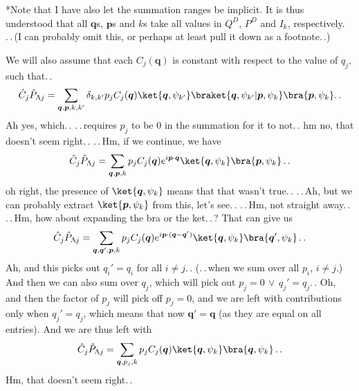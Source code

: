 \documentclass{report}
\begin{document}
*Note that I have also let the summation ranges be implicit. It is thus understood that all $\boldsymbol{q}$s, $\boldsymbol{p}$s and $k$s take all values in $Q^D$, $P^D$ and $I_k$, respectively. .\,.\,(I can probably omit this, or perhaps at least pull it down as a footnote.\,.)

We will also assume that each $C_j(\boldsymbol{q})$ is constant with respect to the value of $q_j$, such that.\,.
\begin{align}
\begin{aligned}
	\hat C_{j} \hat P_{\Lambda j} = 
		\sum_{\boldsymbol{q}, \boldsymbol{p}, k, k'}\delta_{k, k'} 
		p_j C_j(\boldsymbol{q})
		\ket{\boldsymbol{q}, \psi_{k'}}
		\braket{\boldsymbol{q}, \psi_{k'} | \boldsymbol{p}, \psi_k} 
		\bra{\boldsymbol{p}, \psi_{k}}.\,.
\end{aligned}
\end{align} 
Ah yes, which.\,. .\,.\,requires $p_j$ to be 0 in the summation for it to not.\,. hm no, that doesn't seem right.\,. .\,.\,Hm, if we continue, we have 
\begin{align}
\begin{aligned}
	\hat C_{j} \hat P_{\Lambda j} = 
		\sum_{\boldsymbol{q}, \boldsymbol{p}, k}
		p_j C_j(\boldsymbol{q}) e^{i \boldsymbol{p} \cdot \boldsymbol{q}}
		\ket{\boldsymbol{q}, \psi_{k}}
		\bra{\boldsymbol{p}, \psi_{k}} \,.\,.
\end{aligned}
\end{align} 
oh right, the presence of $\ket{\boldsymbol{q}, \psi_{k}}$ means that that wasn't true.\,. .\,.\,Ah, but we can probably extract $\ket{\boldsymbol{p}, \psi_k}$ from this, let's see.\,. .\,.\,Hm, not straight away.\,. .\,.\,Hm, how about expanding the bra or the ket.\,.\,? That can give us
\begin{align}
\begin{aligned}
	\hat C_{j} \hat P_{\Lambda j} = 
		\sum_{\boldsymbol{q}, \boldsymbol{q}', \boldsymbol{p}, k}
		p_j C_j(\boldsymbol{q}) e^{i \boldsymbol{p} \cdot (\boldsymbol{q} - \boldsymbol{q}')}
		\ket{\boldsymbol{q}, \psi_{k}}
		\bra{\boldsymbol{q}', \psi_{k}} \,.\,.
\end{aligned}
\end{align} 
Ah, and this picks out $q_i' = q_i$ for all $i\neq j$.\,. (.\,.\,when we sum over all $p_i$, $i\neq j$.) And then we can also sum over $q_j$, which will pick out $p_j = 0 \,\lor\, q_j' = q_j$.\,. Oh, and then the factor of $p_j$ will pick off $p_j = 0$, and we are left with contributions only when $ q_j' = q_j$, which means that now $\boldsymbol{q}' = \boldsymbol{q}$ (as they are equal on all entries). And we are thus left with 
\begin{align}
\begin{aligned}
	\hat C_{j} \hat P_{\Lambda j} = 
		\sum_{\boldsymbol{q}, p_j, k}
		p_j C_j(\boldsymbol{q}) 
		\ket{\boldsymbol{q}, \psi_{k}}
		\bra{\boldsymbol{q}, \psi_{k}}\,.\,.
\end{aligned}
\end{align} 
Hm, that doesn't seem right.\,. %
\end{document}
